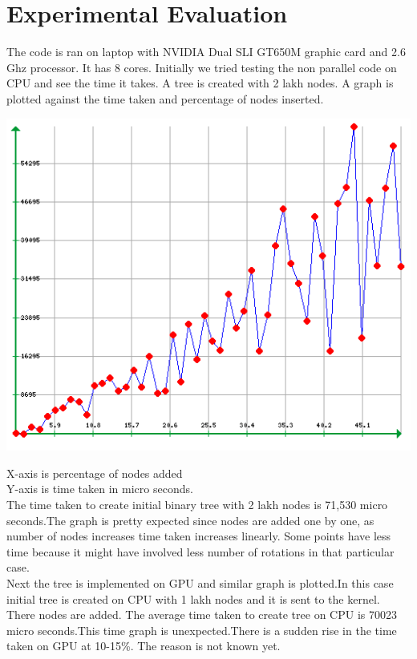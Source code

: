 \documentclass[BTech]{iitmdiss}
\begin{document}
\chapter{Experimental Evaluation}

The code is ran on laptop with NVIDIA Dual SLI GT650M graphic card and 2.6 Ghz processor. It has 8 cores.
Initially we tried testing the non parallel code on CPU and see the time it takes. A tree is created with 2 lakh nodes. A graph is plotted against the time taken and percentage of nodes inserted.\\
\centerline{\includegraphics{Graph_seed3.png}}
X-axis is percentage of nodes added\\
Y-axis is time taken in micro seconds.\\
The time taken to create initial binary tree with 2 lakh nodes is 71,530 micro seconds.The graph is pretty expected since nodes are added one by one, as number of nodes increases time taken increases linearly. Some points have less time because it might have involved less number of rotations in that particular case.\\
Next the tree is implemented on GPU and similar graph is plotted.In this case initial tree is created on CPU with 1 lakh nodes and it is sent to the kernel. There nodes are added. The average time taken to create tree on CPU is 70023 micro seconds.This time graph is unexpected.There is a sudden rise in the time taken on GPU at 10-15\%. The reason is not known yet.\\
\end{document}
